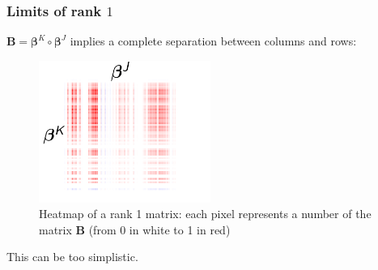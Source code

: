 \documentclass{beamer}
\begin{document}
\begin{frame}
    \frametitle{Limits of rank $1$}
    \vspace{10 pt}
    $\mathbf{B} = \bm{\beta}^K \circ \bm{\beta}^J$ \hspace{0.5 pt} implies a complete separation between columns and rows:
    \begin{figure}
            \centering
            \includegraphics[width=0.5\textwidth]{images/picto_500/heatmap_logistic_multibloc_simu_500_multiway.png}
            \caption{\centering Heatmap of a rank 1 matrix: each pixel represents a number of the matrix $\mathbf{B}$ (from 0 in white to 1 in red)}
    \end{figure}
    \begin{center}
        This can be too simplistic.
    \end{center}


\end{frame}
\end{document}
